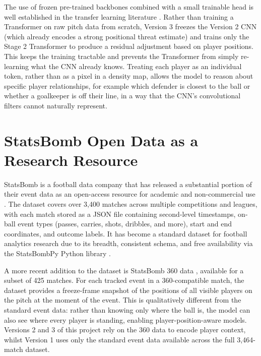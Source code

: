 The use of frozen pre-trained backbones combined with a small trainable head is well established in the transfer learning literature \cite{devlin2019}. Rather than training a Transformer on raw pitch data from scratch, Version 3 freezes the Version 2 CNN (which already encodes a strong positional threat estimate) and trains only the Stage 2 Transformer to produce a residual adjustment based on player positions. This keeps the training tractable and prevents the Transformer from simply re-learning what the CNN already knows. Treating each player as an individual token, rather than as a pixel in a density map, allows the model to reason about specific player relationships, for example which defender is closest to the ball or whether a goalkeeper is off their line, in a way that the CNN's convolutional filters cannot naturally represent.

\section{StatsBomb Open Data as a Research Resource}

StatsBomb is a football data company that has released a substantial portion of their event data as an open-access resource for academic and non-commercial use \cite{statsbomb2018}. The dataset covers over 3,400 matches across multiple competitions and leagues, with each match stored as a JSON file containing second-level timestamps, on-ball event types (passes, carries, shots, dribbles, and more), start and end coordinates, and outcome labels. It has become a standard dataset for football analytics research due to its breadth, consistent schema, and free availability via the StatsBombPy Python library \cite{statsbombpy}.

A more recent addition to the dataset is StatsBomb 360 data \cite{statsbomb360}, available for a subset of 425 matches. For each tracked event in a 360-compatible match, the dataset provides a freeze-frame snapshot of the positions of all visible players on the pitch at the moment of the event. This is qualitatively different from the standard event data: rather than knowing only where the ball is, the model can also see where every player is standing, enabling player-position-aware models. Versions 2 and 3 of this project rely on the 360 data to encode player context, whilst Version 1 uses only the standard event data available across the full 3,464-match dataset.
